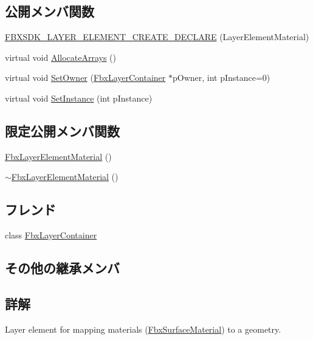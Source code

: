 \subsection*{公開メンバ関数}
\begin{DoxyCompactItemize}
\item 
\hyperlink{class_fbx_layer_element_material_a28e7e3a7c499ecf9beb67ab1111e1e29}{F\+B\+X\+S\+D\+K\+\_\+\+L\+A\+Y\+E\+R\+\_\+\+E\+L\+E\+M\+E\+N\+T\+\_\+\+C\+R\+E\+A\+T\+E\+\_\+\+D\+E\+C\+L\+A\+RE} (Layer\+Element\+Material)
\item 
virtual void \hyperlink{class_fbx_layer_element_material_a5bf99bae72fa4a516eed88e04a66b7ff}{Allocate\+Arrays} ()
\item 
virtual void \hyperlink{class_fbx_layer_element_material_afe025ea61981c53c05cb97bcd9174631}{Set\+Owner} (\hyperlink{class_fbx_layer_container}{Fbx\+Layer\+Container} $\ast$p\+Owner, int p\+Instance=0)
\item 
virtual void \hyperlink{class_fbx_layer_element_material_a45d70417f95d962c5e41bed5480888dc}{Set\+Instance} (int p\+Instance)
\end{DoxyCompactItemize}
\subsection*{限定公開メンバ関数}
\begin{DoxyCompactItemize}
\item 
\hyperlink{class_fbx_layer_element_material_ad5f7288e3fc7f3d58853b12390766fe3}{Fbx\+Layer\+Element\+Material} ()
\item 
\hyperlink{class_fbx_layer_element_material_aff5bc662b9c38efaea5b61de0d108088}{$\sim$\+Fbx\+Layer\+Element\+Material} ()
\end{DoxyCompactItemize}
\subsection*{フレンド}
\begin{DoxyCompactItemize}
\item 
class \hyperlink{class_fbx_layer_element_material_a791d2046ce60bf6f5fb85d9dc6242f2e}{Fbx\+Layer\+Container}
\end{DoxyCompactItemize}
\subsection*{その他の継承メンバ}


\subsection{詳解}
Layer element for mapping materials (\hyperlink{class_fbx_surface_material}{Fbx\+Surface\+Material}) to a geometry.

